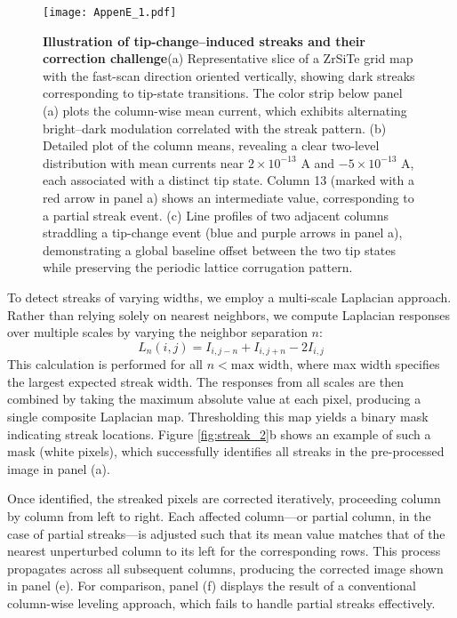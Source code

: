 \begin{figure}
	\texttt{[image: AppenE\_1.pdf]}
	\centering
	\caption[\textbf{Illustration of tip-change–induced streaks and their correction challenge}]{\textbf{Illustration of tip-change–induced streaks and their correction challenge}(a) Representative slice of a ZrSiTe grid map with the fast-scan direction oriented vertically, showing dark streaks corresponding to tip-state transitions. The color strip below panel (a) plots the column-wise mean current, which exhibits alternating bright–dark modulation correlated with the streak pattern. (b) Detailed plot of the column means, revealing a clear two-level distribution with mean currents near $2\times10^{-13}$ A and $-5\times10^{-13}$ A, each associated with a distinct tip state. Column 13 (marked with a red arrow in panel a) shows an intermediate value, corresponding to a partial streak event. (c) Line profiles of two adjacent columns straddling a tip-change event (blue and purple arrows in panel a), demonstrating a global baseline offset between the two tip states while preserving the periodic lattice corrugation pattern.}
	\label{fig:streak_1}
\end{figure}

To detect streaks of varying widths, we employ a multi-scale Laplacian approach. Rather than relying solely on nearest neighbors, we compute Laplacian responses over multiple scales by varying the neighbor separation $n$:
$$L_n(i,j) = I_{i,j-n} + I_{i,j+n} - 2I_{i,j}$$
This calculation is performed for all $n < \text{max width}$, where max width specifies the largest expected streak width. The responses from all scales are then combined by taking the maximum absolute value at each pixel, producing a single composite Laplacian map. Thresholding this map yields a binary mask indicating streak locations. Figure \ref{fig:streak_2}b shows an example of such a mask (white pixels), which successfully identifies all streaks in the pre-processed image in panel (a).

Once identified, the streaked pixels are corrected iteratively, proceeding column by column from left to right. Each affected column—or partial column, in the case of partial streaks—is adjusted such that its mean value matches that of the nearest unperturbed column to its left for the corresponding rows. This process propagates across all subsequent columns, producing the corrected image shown in panel (e). For comparison, panel (f) displays the result of a conventional column-wise leveling approach, which fails to handle partial streaks effectively.

